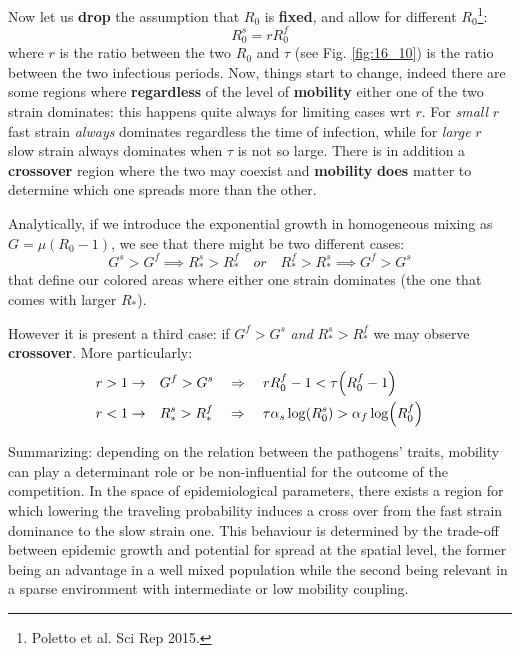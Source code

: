 \documentclass[../main/main.tex]{subfiles}
\begin{document}
Now let us \textbf{drop} the assumption that $R_0$ is \textbf{fixed}, and allow for different $R_0$\footnote{Poletto et al. Sci Rep 2015.}:
\begin{equation}
    R_0 ^ s = r R_0^f
\end{equation}
where $r$ is the ratio between the two $R_0$ and $\tau$ (see Fig. \ref{fig:16_10}) is the ratio between the two infectious periods.
Now, things start to change, indeed there are some regions where \textbf{regardless} of the level of \textbf{mobility} either one of the two strain dominates: this happens quite always for limiting cases wrt $r$. For \textit{small} $r$ fast strain \textit{always} dominates regardless the time of infection, while for \textit{large} $r$ slow strain always dominates when $\tau$ is not so large. There is in addition a \textbf{crossover} region where the two may coexist and \textbf{mobility} \textbf{does} matter to determine which one spreads more than the other. 

Analytically, if we introduce the exponential growth in homogeneous mixing as $G=\mu(R_0 -1)$, we see that there might be two different cases:
\begin{equation}
    G^s > G^f \implies R_*^s > R_*^f \quad or \quad R_*^f > R_*^s \implies G^f > G^s
\end{equation}
that define our colored areas where either one strain dominates (the one that comes with larger $R_*$). 

However it is present a third case: if $G^f > G^s$ \textit{and} $R_*^s > R_*^f$ we may observe \textbf{crossover}.
More particularly:
\begin{subequations}
\begin{align*}
  r>1 \rightarrow \quad & G^f > G^s \quad \Rightarrow \quad r R_0^f - 1 < \tau \qty(R_0^f-1) \\
  r<1 \rightarrow \quad & R_*^s > R_*^f \quad \Rightarrow  \quad  \tau  \alpha _s \log (R_0^s) > \alpha _f \log (R_0^f)
\end{align*}
\end{subequations}

Summarizing: depending on the relation between the pathogens’ traits, mobility can play a determinant role or be non-influential for the outcome of the competition. In the space of epidemiological parameters, there exists a region for which lowering the traveling probability induces a cross over from the fast strain dominance to the slow strain one. This behaviour is determined by the trade-off between epidemic growth and potential for spread at the spatial level, the former being an advantage in a well mixed population while the second being relevant in a sparse environment with intermediate or low mobility coupling.
\end{document}
